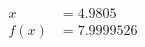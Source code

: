 \documentclass[preview]{standalone}
\begin{document}
\begin{align*}
x &= 4.9805\\f(x) &= 7.9999526
\end{align*}
\end{document}
